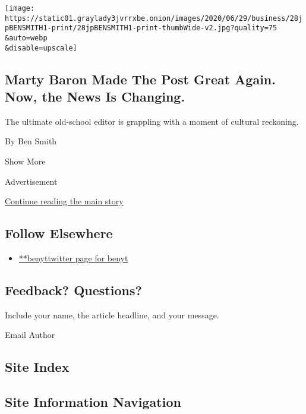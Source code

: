 \begin{enumerate}
  \texttt{[image: https://static01.graylady3jvrrxbe.onion/images/2020/06/29/business/28jpBENSMITH1-print/28jpBENSMITH1-print-thumbWide-v2.jpg?quality=75\\\&auto=webp\\\&disable=upscale]}

  \hypertarget{marty-baron-made-the-post-great-again-now-the-news-is-changing}{%
  \subsection{Marty Baron Made The Post Great Again. Now, the News Is
  Changing.}\label{marty-baron-made-the-post-great-again-now-the-news-is-changing}}

  The ultimate old-school editor is grappling with a moment of cultural
  reckoning.

  By Ben Smith
\end{enumerate}

Show More

Advertisement

\protect\hyperlink{after-mid2}{Continue reading the main story}

\hypertarget{follow-elsewhere}{%
\subsection{Follow Elsewhere}\label{follow-elsewhere}}

\begin{itemize}
\tightlist
\item
  \href{https://twitter.com/benyt}{**benyttwitter page for benyt}
\end{itemize}

\hypertarget{feedback-questions}{%
\subsection{Feedback? Questions?}\label{feedback-questions}}

Include your name, the article headline, and your message.

Email Author

\hypertarget{site-index}{%
\subsection{Site Index}\label{site-index}}

\hypertarget{site-information-navigation}{%
\subsection{Site Information
Navigation}\label{site-information-navigation}}

